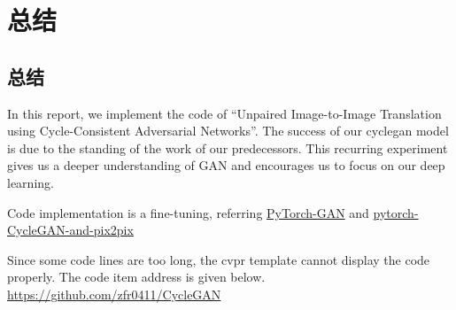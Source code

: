 \chapter{\heiti \label{ch5}总结}

\section{\heiti \label{sec:5.1}总结}
In this report, we implement the code of 
“Unpaired Image-to-Image Translation 
using Cycle-Consistent Adversarial Networks”. 
The success of our cyclegan model is 
due to the standing of the work of our predecessors.
This recurring experiment gives us a deeper 
understanding of GAN and encourages us to focus on our deep learning.


Code implementation is a fine-tuning, referring \href{https://github.com/eriklindernoren/PyTorch-GAN}{PyTorch-GAN}
and 
\href{https://github.com/junyanz/pytorch-CycleGAN-and-pix2pix}{pytorch-CycleGAN-and-pix2pix}





Since some code lines are too long, the cvpr template cannot display the code properly. The code item address is given below.	\url{https://github.com/zfr0411/CycleGAN}
